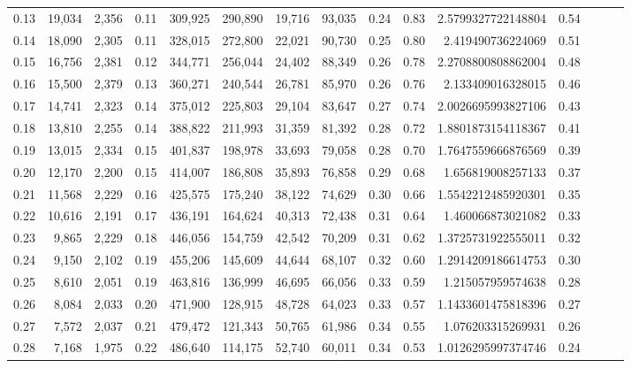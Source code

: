 \begin{tabular}{rrrrrrrrrrrrrrr}
0.13 &  19,034 &  2,356 &  0.11 &  309,925 &  290,890 &   19,716 &   93,035 &  0.24 &  0.83 &    2.5799327722148804 &      0.54 \\
0.14 &  18,090 &  2,305 &  0.11 &  328,015 &  272,800 &   22,021 &   90,730 &  0.25 &  0.80 &     2.419490736224069 &      0.51 \\
0.15 &  16,756 &  2,381 &  0.12 &  344,771 &  256,044 &   24,402 &   88,349 &  0.26 &  0.78 &    2.2708800808862004 &      0.48 \\
0.16 &  15,500 &  2,379 &  0.13 &  360,271 &  240,544 &   26,781 &   85,970 &  0.26 &  0.76 &     2.133409016328015 &      0.46 \\
0.17 &  14,741 &  2,323 &  0.14 &  375,012 &  225,803 &   29,104 &   83,647 &  0.27 &  0.74 &    2.0026695993827106 &      0.43 \\
0.18 &  13,810 &  2,255 &  0.14 &  388,822 &  211,993 &   31,359 &   81,392 &  0.28 &  0.72 &    1.8801873154118367 &      0.41 \\
0.19 &  13,015 &  2,334 &  0.15 &  401,837 &  198,978 &   33,693 &   79,058 &  0.28 &  0.70 &    1.7647559666876569 &      0.39 \\
0.20 &  12,170 &  2,200 &  0.15 &  414,007 &  186,808 &   35,893 &   76,858 &  0.29 &  0.68 &     1.656819008257133 &      0.37 \\
0.21 &  11,568 &  2,229 &  0.16 &  425,575 &  175,240 &   38,122 &   74,629 &  0.30 &  0.66 &    1.5542212485920301 &      0.35 \\
0.22 &  10,616 &  2,191 &  0.17 &  436,191 &  164,624 &   40,313 &   72,438 &  0.31 &  0.64 &     1.460066873021082 &      0.33 \\
0.23 &   9,865 &  2,229 &  0.18 &  446,056 &  154,759 &   42,542 &   70,209 &  0.31 &  0.62 &    1.3725731922555011 &      0.32 \\
0.24 &   9,150 &  2,102 &  0.19 &  455,206 &  145,609 &   44,644 &   68,107 &  0.32 &  0.60 &    1.2914209186614753 &      0.30 \\
0.25 &   8,610 &  2,051 &  0.19 &  463,816 &  136,999 &   46,695 &   66,056 &  0.33 &  0.59 &     1.215057959574638 &      0.28 \\
0.26 &   8,084 &  2,033 &  0.20 &  471,900 &  128,915 &   48,728 &   64,023 &  0.33 &  0.57 &    1.1433601475818396 &      0.27 \\
0.27 &   7,572 &  2,037 &  0.21 &  479,472 &  121,343 &   50,765 &   61,986 &  0.34 &  0.55 &     1.076203315269931 &      0.26 \\
0.28 &   7,168 &  1,975 &  0.22 &  486,640 &  114,175 &   52,740 &   60,011 &  0.34 &  0.53 &    1.0126295997374746 &      0.24 \\

\end{tabular}
